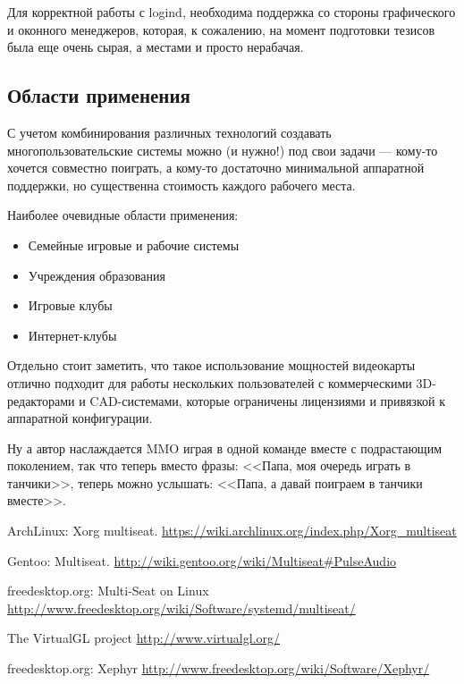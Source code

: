 \documentclass[10pt, a5paper]{article}
\begin{document}
Для корректной работы с logind, необходима поддержка со стороны графического и оконного менеджеров,
которая, к сожалению, на момент подготовки тезисов была еще очень сырая,
а местами и просто нерабачая.

\subsection*{Области применения}

С учетом комбинирования различных технологий создавать многопользовательские системы можно (и нужно!)
под свои задачи --- кому-то хочется совместно поиграть, а кому-то достаточно минимальной аппаратной 
поддержки, но существенна стоимость каждого рабочего места.

Наиболее очевидные области применения:

\begin{itemize}
	\item Семейные игровые и рабочие системы
	\item Учреждения образования
	\item Игровые клубы
	\item Интернет-клубы
\end{itemize}

Отдельно стоит заметить, что такое использование мощностей видеокарты отлично
подходит для работы нескольких пользователей с коммерческими 3D-редакторами и CAD-системами,
которые ограничены лицензиями и привязкой к аппаратной конфигурации.

Ну а автор наслаждается MMO играя в одной команде вместе с подрастающим поколением,
так что теперь вместо фразы: <<Папа, моя очередь играть в танчики>>, теперь можно 
услышать: <<Папа, а давай поиграем в танчики вместе>>.


\begin{thebibliography}{9}

 ArchLinux: Xorg multiseat.
\url{https://wiki.archlinux.org/index.php/Xorg_multiseat}

 Gentoo: Multiseat.
\url{http://wiki.gentoo.org/wiki/Multiseat#PulseAudio}


 freedesktop.org: Multi-Seat on Linux
\url{http://www.freedesktop.org/wiki/Software/systemd/multiseat/}

 The VirtualGL project
\url{http://www.virtualgl.org/}

 freedesktop.org: Xephyr
\url{http://www.freedesktop.org/wiki/Software/Xephyr/}

\end{thebibliography}
\end{document}
